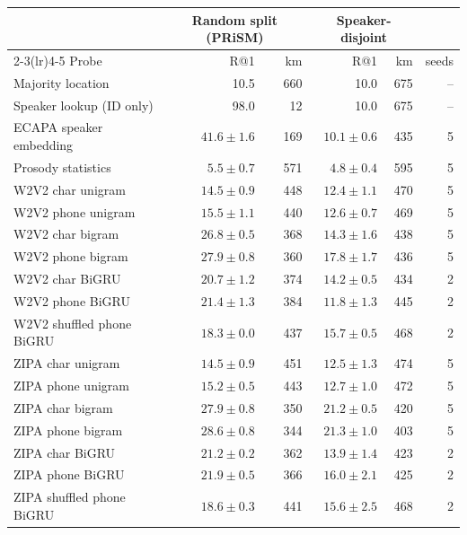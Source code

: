 \begin{tabular}{lrrrrr}
\toprule
 & \multicolumn{2}{c}{Random split (PRiSM)} & \multicolumn{2}{c}{Speaker-disjoint} & \\
\cmidrule(lr){2-3}\cmidrule(lr){4-5}
Probe & R@1 & km & R@1 & km & seeds \\
\midrule
Majority location & 10.5 & 660 & 10.0 & 675 & -- \\
Speaker lookup (ID only) & 98.0 & 12 & 10.0 & 675 & -- \\
\midrule
ECAPA speaker embedding & $41.6 \pm 1.6$ & 169 & $10.1 \pm 0.6$ & 435 & 5 \\
Prosody statistics & $5.5 \pm 0.7$ & 571 & $4.8 \pm 0.4$ & 595 & 5 \\
\midrule
W2V2 char unigram & $14.5 \pm 0.9$ & 448 & $12.4 \pm 1.1$ & 470 & 5 \\
W2V2 phone unigram & $15.5 \pm 1.1$ & 440 & $12.6 \pm 0.7$ & 469 & 5 \\
W2V2 char bigram & $26.8 \pm 0.5$ & 368 & $14.3 \pm 1.6$ & 438 & 5 \\
W2V2 phone bigram & $27.9 \pm 0.8$ & 360 & $17.8 \pm 1.7$ & 436 & 5 \\
W2V2 char BiGRU & $20.7 \pm 1.2$ & 374 & $14.2 \pm 0.5$ & 434 & 2 \\
W2V2 phone BiGRU & $21.4 \pm 1.3$ & 384 & $11.8 \pm 1.3$ & 445 & 2 \\
W2V2 shuffled phone BiGRU & $18.3 \pm 0.0$ & 437 & $15.7 \pm 0.5$ & 468 & 2 \\
ZIPA char unigram & $14.5 \pm 0.9$ & 451 & $12.5 \pm 1.3$ & 474 & 5 \\
ZIPA phone unigram & $15.2 \pm 0.5$ & 443 & $12.7 \pm 1.0$ & 472 & 5 \\
ZIPA char bigram & $27.9 \pm 0.8$ & 350 & $21.2 \pm 0.5$ & 420 & 5 \\
ZIPA phone bigram & $\mathbf{28.6 \pm 0.8}$ & 344 & $\mathbf{21.3 \pm 1.0}$ & 403 & 5 \\
ZIPA char BiGRU & $21.2 \pm 0.2$ & 362 & $13.9 \pm 1.4$ & 423 & 2 \\
ZIPA phone BiGRU & $21.9 \pm 0.5$ & 366 & $16.0 \pm 2.1$ & 425 & 2 \\
ZIPA shuffled phone BiGRU & $18.6 \pm 0.3$ & 441 & $15.6 \pm 2.5$ & 468 & 2 \\
\bottomrule
\end{tabular}
